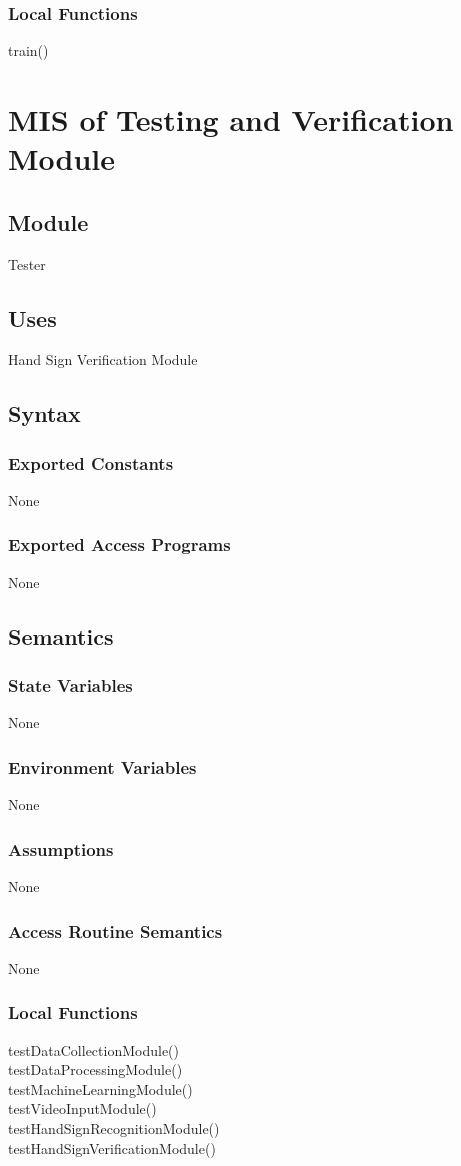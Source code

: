 \documentclass[12pt, titlepage]{article}
\begin{document}
\subsubsection{Local Functions}
train()

\newpage

\section{MIS of Testing and Verification Module} \label{Module} 
\subsection{Module}
Tester
\subsection{Uses}
Hand Sign Verification Module
\subsection{Syntax}
 \subsubsection{Exported Constants}
 None
 \subsubsection{Exported Access Programs}
 None
\subsection{Semantics}
\subsubsection{State Variables}
None
\subsubsection{Environment Variables}
None
\subsubsection{Assumptions}
None
\subsubsection{Access Routine Semantics}
None
\subsubsection{Local Functions}
testDataCollectionModule()\\
testDataProcessingModule()\\
testMachineLearningModule()\\
testVideoInputModule()\\
testHandSignRecognitionModule()\\
testHandSignVerificationModule()\\
\end{document}
